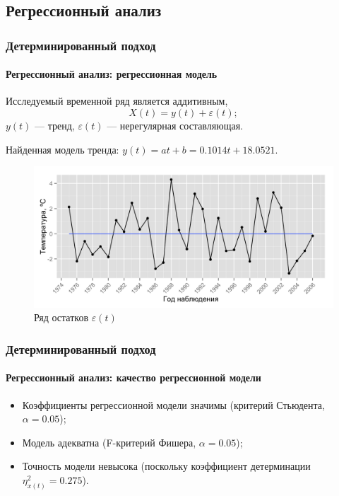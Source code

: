 \documentclass{beamer}
\begin{document}
\subsection{Регрессионный анализ}
\begin{frame}
  \frametitle{Детерминированный подход}
  \framesubtitle{Регрессионный анализ: регрессионная модель}
  \begin{multicols}{2}
  Исследуемый временной ряд является аддитивным,
  \begin{equation}
    X(t) = y(t) + \varepsilon(t);
  \end{equation}
  $ y(t) $ --- тренд, $ \varepsilon(t) $ --- нерегулярная составляющая.
  
  \medskip
  
  Найденная модель тренда: $ y(t) = at + b = 0.1014t + 18.0521 $.
  
  \columnbreak
    \begin{figure}[h]
    \includegraphics[width=1\linewidth]{../../figures/residual/time-series.png}
    \caption{Ряд остатков $ \varepsilon(t) $}
  \end{figure}
  \end{multicols}
\end{frame}

\begin{frame}
  \frametitle{Детерминированный подход}
  \framesubtitle{Регрессионный анализ: качество регрессионной модели}
  
  
  
  \begin{itemize}
    \item Коэффициенты регрессионной модели значимы (критерий Стьюдента, $ \alpha=0.05 $);
    \item Модель адекватна (F-критерий Фишера, $ \alpha = 0.05 $);
    \item Точность модели невысока (поскольку коэффициент детерминации $ \eta^2_{x(t)} = 0.275 $).
  \end{itemize}
\end{frame}
\end{document}
